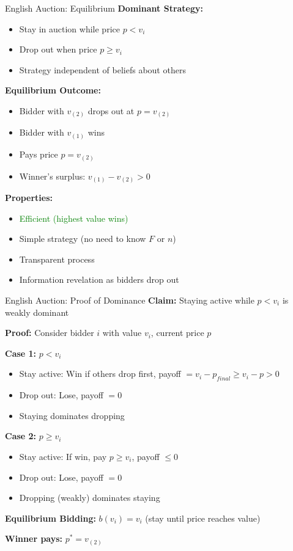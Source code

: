 \documentclass[xcolor={x11names}, aspectratio=169 ]{beamer}
\begin{document}
\begin{frame}{English Auction: Equilibrium}
\textbf{Dominant Strategy:}
\begin{itemize}
  \item Stay in auction while price $p < v_i$
  \item Drop out when price $p \geq v_i$
  \item Strategy independent of beliefs about others
\end{itemize}

\textbf{Equilibrium Outcome:}
\begin{itemize}
  \item Bidder with $v_{(2)}$ drops out at $p = v_{(2)}$
  \item Bidder with $v_{(1)}$ wins
  \item Pays price $p = v_{(2)}$
  \item Winner's surplus: $v_{(1)} - v_{(2)} > 0$
\end{itemize}

\textbf{Properties:}
\begin{itemize}
  \item \textcolor{green}{Efficient (highest value wins)}
  \item Simple strategy (no need to know $F$ or $n$)
  \item Transparent process
  \item Information revelation as bidders drop out
\end{itemize}
\end{frame}

\begin{frame}{English Auction: Proof of Dominance}
\textbf{Claim:} Staying active while $p < v_i$ is weakly dominant

\textbf{Proof:} Consider bidder $i$ with value $v_i$, current price $p$

\textbf{Case 1:} $p < v_i$
\begin{itemize}
  \item Stay active: Win if others drop first, payoff $= v_i - p_{final} \geq v_i - p > 0$
  \item Drop out: Lose, payoff $= 0$
  \item Staying dominates dropping
\end{itemize}

\textbf{Case 2:} $p \geq v_i$
\begin{itemize}
  \item Stay active: If win, pay $p \geq v_i$, payoff $\leq 0$
  \item Drop out: Lose, payoff $= 0$
  \item Dropping (weakly) dominates staying
\end{itemize}

\textbf{Equilibrium Bidding:} $b(v_i) = v_i$ (stay until price reaches value)

\textbf{Winner pays:} $p^* = v_{(2)}$
\end{frame}
\end{document}
